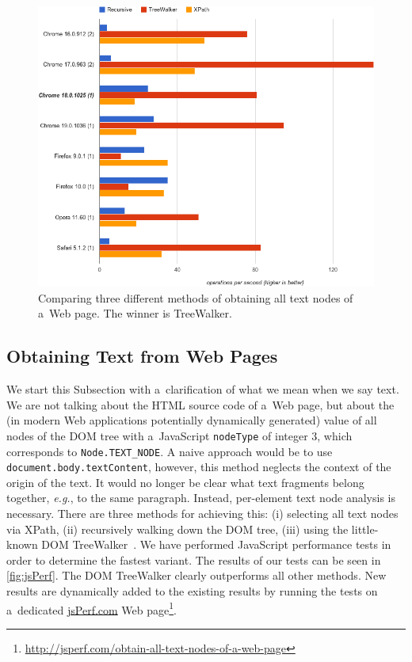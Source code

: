 \documentclass{acm_proc_article-sp}
\let\oldemph\emph
\renewcommand{\emph}[1]{\oldemph{\fontsize{9}{9}\selectfont #1}}
\newcommand{\inlinelistingsize}{\fontsize{8pt}{11pt}}
\let\oldurl\url
\renewcommand{\url}[1]{\inlinelistingsize\oldurl{#1}}
\begin{document}
\begin{figure}[t!]
\begin{center}
   \includegraphics[width=1\linewidth]{./jsPerf.png}
\end{center}
   \caption{Comparing three different methods of obtaining all text nodes of a~Web page. The winner is TreeWalker.}
\label{fig:jsPerf}
\end{figure}

\subsection{Obtaining Text from Web Pages}
We start this Subsection with a~clarification of what we mean when we say text.
We are not talking about the HTML source code of a~Web page,
but about the (in modern Web applications potentially dynamically generated) value of all nodes
of the DOM tree with a~JavaScript \texttt{nodeType} of integer $3$,
which corresponds to \texttt{Node.TEXT\_NODE}.
A naive approach would be to use \texttt{document.body.textContent}, however,
this method neglects the context of the origin of the text.
It would no longer be clear what text fragments belong together, \emph{e.g.}, to the same paragraph.
Instead, per-element text node analysis is necessary.
There are three methods for achieving this:
(i) selecting all text nodes via XPath,
(ii) recursively walking down the DOM tree,
(iii) using the little-known DOM TreeWalker~\cite{treewalker}.
We have performed JavaScript performance tests in order to determine the fastest variant.
The results of our tests can be seen in \autoref{fig:jsPerf}.
The DOM TreeWalker clearly outperforms all other methods.
New results are dynamically added to the existing results by running the tests on a~dedicated \url{jsPerf.com} Web page\footnote{\url{http://jsperf.com/obtain-all-text-nodes-of-a-web-page}}.
\end{document}

